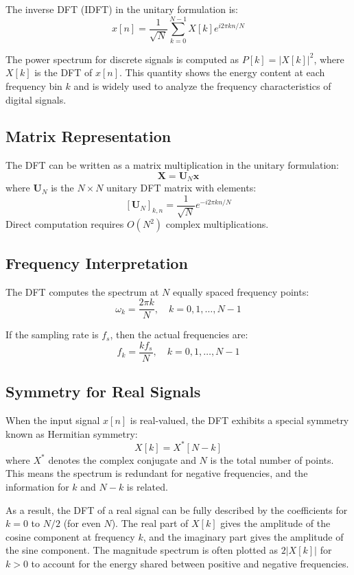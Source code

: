 \documentclass[11pt,a4paper]{article}
\begin{document}
The inverse DFT (IDFT) in the unitary formulation is:
\[
x[n] = \frac{1}{\sqrt{N}} \sum_{k=0}^{N-1} X[k] e^{i 2\pi k n / N}
\]

The power spectrum for discrete signals is computed as $P[k] = |X[k]|^2$, where $X[k]$ is the DFT of $x[n]$. This quantity shows the energy content at each frequency bin $k$ and is widely used to analyze the frequency characteristics of digital signals.


\subsection{Matrix Representation}

The DFT can be written as a matrix multiplication in the unitary formulation:
\[
\mathbf{X} = \mathbf{U}_N \mathbf{x}
\]
where $\mathbf{U}_N$ is the $N \times N$ unitary DFT matrix with elements:
\[
[\mathbf{U}_N]_{k,n} = \frac{1}{\sqrt{N}} e^{-i 2\pi k n / N}
\]
Direct computation requires $O(N^2)$ complex multiplications.

\subsection{Frequency Interpretation}

The DFT computes the spectrum at $N$ equally spaced frequency points:
\begin{equation}
\omega_k = \frac{2\pi k}{N}, \quad k = 0, 1, \ldots, N-1
\end{equation}

If the sampling rate is $f_s$, then the actual frequencies are:
\begin{equation}
f_k = \frac{k f_s}{N}, \quad k = 0, 1, \ldots, N-1
\end{equation}

\subsection{Symmetry for Real Signals}

When the input signal $x[n]$ is real-valued, the DFT exhibits a special symmetry known as Hermitian symmetry:
\begin{equation}
X[k] = X^*[N - k]
\end{equation}
where $X^*$ denotes the complex conjugate and $N$ is the total number of points. This means the spectrum is redundant for negative frequencies, and the information for $k$ and $N-k$ is related.

As a result, the DFT of a real signal can be fully described by the coefficients for $k = 0$ to $N/2$ (for even $N$). The real part of $X[k]$ gives the amplitude of the cosine component at frequency $k$, and the imaginary part gives the amplitude of the sine component. The magnitude spectrum is often plotted as $2|X[k]|$ for $k > 0$ to account for the energy shared between positive and negative frequencies.
\end{document}
